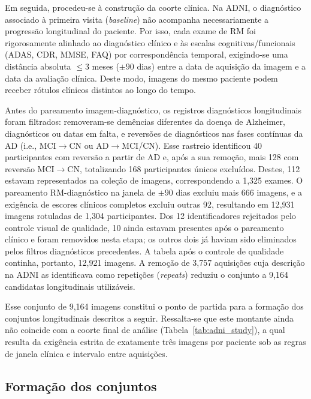 \documentclass[review]{elsarticle}
\begin{document}
Em seguida, procedeu-se à construção da coorte clínica. Na ADNI, o diagnóstico associado à primeira visita (\textit{baseline}) não acompanha necessariamente a progressão longitudinal do paciente. Por isso, cada exame de RM foi rigorosamente alinhado ao diagnóstico clínico e às escalas cognitivas/funcionais (ADAS, CDR, MMSE, FAQ) por correspondência temporal, exigindo-se uma distância absoluta $\leq 3$ meses ($\pm 90$ dias) entre a data de aquisição da imagem e a data da avaliação clínica. Deste modo, imagens do mesmo paciente podem receber rótulos clínicos distintos ao longo do tempo. 

Antes do pareamento imagem-diagnóstico, os registros diagnósticos longitudinais foram filtrados: removeram-se demências diferentes da doença de Alzheimer, diagnósticos ou datas em falta, e reversões de diagnósticos nas fases contínuas da AD (i.e., MCI$\rightarrow$CN ou AD$\rightarrow$MCI/CN). Esse rastreio identificou 40 participantes com reversão a partir de AD e, após a sua remoção, mais 128 com reversão MCI$\rightarrow$CN, totalizando 168 participantes únicos excluídos. Destes, 112 estavam representados na coleção de imagens, correspondendo a 1{,}325 exames. O pareamento RM-diagnóstico na janela de $\pm 90$ dias excluiu mais 666 imagens, e a exigência de escores clínicos completos excluiu outras 92, resultando em 12{,}931 imagens rotuladas de 1{,}304 participantes. Dos 12 identificadores rejeitados pelo controle visual de qualidade, 10 ainda estavam presentes após o pareamento clínico e foram removidos nesta etapa; os outros dois já haviam sido eliminados pelos filtros diagnósticos precedentes. A tabela após o controle de qualidade continha, portanto, 12{,}921 imagens. A remoção de 3{,}757 aquisições cuja descrição na ADNI as identificava como repetições (\emph{repeats}) reduziu o conjunto a 9{,}164 candidatas longitudinais utilizáveis. 

Esse conjunto de 9{,}164 imagens constitui o ponto de partida para a formação dos conjuntos longitudinais descritos a seguir. Ressalta-se que este montante ainda não coincide com a coorte final de análise (Tabela~\ref{tab:adni_study}), a qual resulta da exigência estrita de exatamente três imagens por paciente sob as regras de janela clínica e intervalo entre aquisições.
			


\subsection{Formação dos conjuntos}\label{subsec:formacao}
\end{document}
